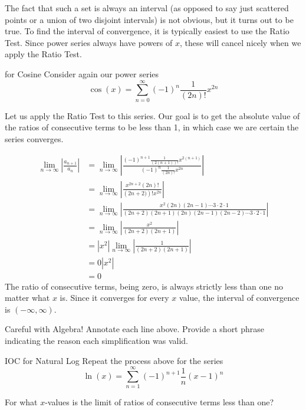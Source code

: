 The fact that such a set is always an interval (as opposed to say just scattered points or a union of two disjoint intervals) is not obvious, but it turns out to be true.  To find the interval of convergence, it is typically easiest to use the Ratio Test.  Since power series always have powers of $x$, these will cancel nicely when we apply the Ratio Test.

\begin{example}{ for Cosine}
Consider again our power series 
$$ \cos(x)=\sum_{n=0}^\infty (-1)^{n}\frac{1}{\left(2n\right)!}x^{2n}$$

Let us apply the Ratio Test to this series.  Our goal is to get the absolute value of the ratios of consecutive terms to be less than 1, in which case we are certain the series converges.

\begin{align*}
\lim_{n \rightarrow \infty}\left| \frac{a_{n+1}}{a_n} \right| &=\lim_{n \rightarrow \infty} \left|\frac{(-1)^{n+1}\frac{1}{\left(2(n+1)\right)!}x^{2(n+1)}}{(-1)^{n}\frac{1}{\left(2n\right)!}x^{2n}} \right| \\
 &=\lim_{n \rightarrow \infty} \left|\frac{x^{2n+2}\left(2n\right)!}{\left(2n+2)\right)!x^{2n}} \right| \\
 &=\lim_{n \rightarrow \infty} \left|\frac{x^{2}\left(2n\right)\left(2n-1\right)\cdots 3\cdot 2 \cdot 1}{\left(2n+2\right)\left(2n+1\right)\left(2n\right)\left(2n-1\right)\left(2n-2\right)\cdots 3\cdot 2 \cdot 1} \right| \\
 &=\lim_{n \rightarrow \infty} \left|\frac{x^{2}}{\left(2n+2\right)\left(2n+1\right)} \right| \\
 &=\left|x^2 \right| \lim_{n \rightarrow \infty} \left|\frac{1}{\left(2n+2\right)\left(2n+1\right)} \right| \\
 &=0\left|x^2 \right| \\
 &=0
\end{align*}
The ratio of consecutive terms, being zero, is always strictly less than one no matter what $x$ is.  Since it converges for every $x$ value, the interval of convergence is $(-\infty, \infty)$.
\end{example}

\begin{exercise}{Careful with Algebra! \Coffeecup}
Annotate each line above. Provide a short phrase indicating the reason each simplification was valid.
\end{exercise}

\begin{exercise}{IOC for Natural Log \Coffeecup \Coffeecup \Coffeecup}
Repeat the process above for the series $$ \ln(x)=\sum_{n=1}^\infty (-1)^{n+1}\frac{1}{n}(x-1)^{n}$$

For what $x$-values is the limit of ratios of consecutive terms less than one?

\vspace*{3in}

\end{exercise}

